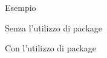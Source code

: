 \begin{frame}[fragile]{Esempio}

\begin{exampleblock}{Senza l'utilizzo di package}
	
\end{exampleblock}

\pause

\begin{exampleblock}{Con l'utilizzo di package}
	
\end{exampleblock}

\end{frame}

